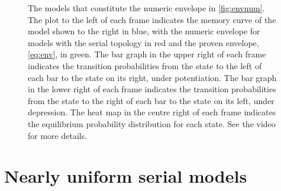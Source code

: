 \documentclass[12pt]{article}
\begin{document}
\begin{figure}[tbp]
\begin{myenuma}
  \end{myenuma}
  \caption[Optimal models]{The models that constitute the numeric envelope in \autoref{fig:envnum}.
  The plot to the left of each frame indicates the memory curve of the model shown to the right in blue, with the numeric envelope for models with the serial topology in red and the proven envelope, \eqref{eq:env}, in green.
  The bar graph in the upper right of each frame indicates the transition probabilities from the state to the left of each bar to the state on its right, under potentiation.
  The bar graph in the lower right of each frame indicates the transition probabilities from the state to the right of each bar to the state on its left, under depression.
  The heat map in the centre right of each frame indicates the equilibrium probability distribution for each state.
  See the video for more details.}\label{fig:envvid}
\end{figure}



\section{Nearly uniform serial models}\label{sec:serial}
\end{document}
